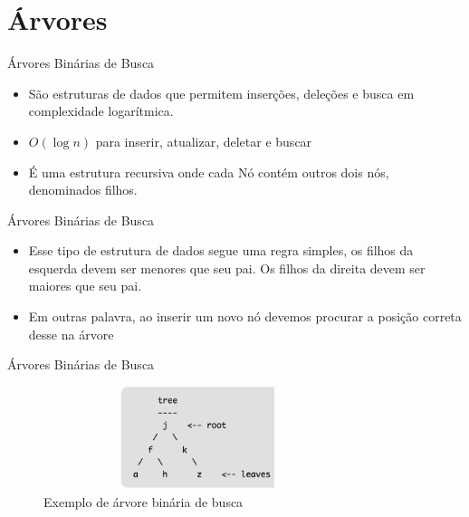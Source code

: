 \section{Árvores}

\begin{frame}
	\begin{block}{Árvores Binárias de Busca}
		\begin{itemize}
			\item São estruturas de dados que permitem inserções, deleções e busca em complexidade logarítmica. 

			\item $O(\log n)$ para inserir, atualizar, deletar e buscar	
			
			\item É uma estrutura recursiva onde cada Nó contém outros dois nós, denominados filhos.

		\end{itemize}
	\end{block}
\end{frame}

\begin{frame}
	\begin{block}{Árvores Binárias de Busca}
		\begin{itemize}
			\item Esse tipo de estrutura de dados segue uma regra simples, os filhos da esquerda devem ser menores que seu pai. Os filhos da direita devem ser maiores que seu pai.

			\item Em outras palavra, ao inserir um novo nó devemos procurar a posição correta desse na árvore
		\end{itemize}
	\end{block}
\end{frame}

\begin{frame}
	\begin{block}{Árvores Binárias de Busca}
		\begin{figure}[!htb]
			\centering	  				
			\includegraphics[height=3cm, width = 9cm]{./pic/arvoreCompletaComun.png}
			\caption{Exemplo de árvore binária de busca}
			\label{fig_pilha}
		\end{figure}
	\end{block}
\end{frame}


